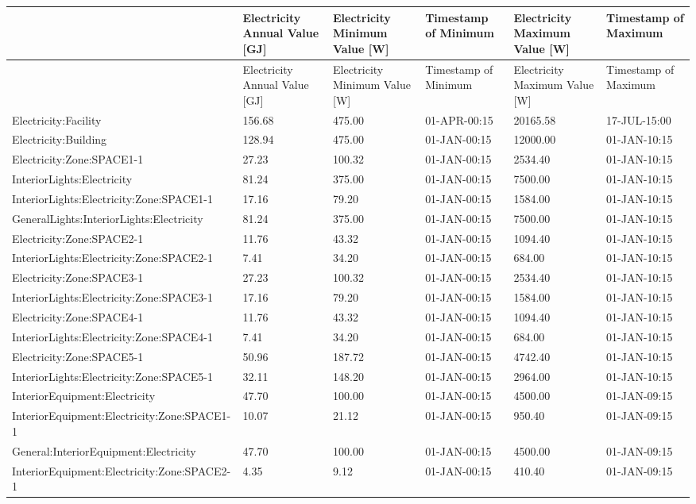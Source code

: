{\scriptsize
\begin{longtable}[c]{>{\raggedright}p{1.5in}>{\raggedright}p{0.9in}>{\raggedright}p{0.9in}>{\raggedright}p{0.9in}>{\raggedright}p{0.9in}>{\raggedright}p{0.9in}}
\toprule 
 & Electricity Annual Value [GJ] & Electricity Minimum Value [W] & Timestamp of Minimum & Electricity Maximum Value [W] & Timestamp of Maximum \tabularnewline
\midrule
\endfirsthead

\toprule 
 & Electricity Annual Value [GJ] & Electricity Minimum Value [W] & Timestamp of Minimum & Electricity Maximum Value [W] & Timestamp of Maximum \tabularnewline
\midrule
\endhead

Electricity\-:Facility & 156.68 & 475.00 & 01-APR-00:15 & 20165.58 & 17-JUL-15:00 \tabularnewline
Electricity\-:Building & 128.94 & 475.00 & 01-JAN-00:15 & 12000.00 & 01-JAN-10:15 \tabularnewline
Electricity\-:Zone:SPACE1-1 & 27.23 & 100.32 & 01-JAN-00:15 & 2534.40 & 01-JAN-10:15 \tabularnewline
InteriorLights\-:Electricity & 81.24 & 375.00 & 01-JAN-00:15 & 7500.00 & 01-JAN-10:15 \tabularnewline
InteriorLights\-:Electricity\-:Zone\-:SPACE1-1 & 17.16 & 79.20 & 01-JAN-00:15 & 1584.00 & 01-JAN-10:15 \tabularnewline
GeneralLights\-:InteriorLights\-:Electricity & 81.24 & 375.00 & 01-JAN-00:15 & 7500.00 & 01-JAN-10:15 \tabularnewline
Electricity\-:Zone\-:SPACE2-1 & 11.76 & 43.32 & 01-JAN-00:15 & 1094.40 & 01-JAN-10:15 \tabularnewline
InteriorLights\-:Electricity\-:Zone\-:SPACE2-1 & 7.41 & 34.20 & 01-JAN-00:15 & 684.00 & 01-JAN-10:15 \tabularnewline
Electricity\-:Zone\-:SPACE3-1 & 27.23 & 100.32 & 01-JAN-00:15 & 2534.40 & 01-JAN-10:15 \tabularnewline
InteriorLights\-:Electricity\-:Zone\-:SPACE3-1 & 17.16 & 79.20 & 01-JAN-00:15 & 1584.00 & 01-JAN-10:15 \tabularnewline
Electricity\-:Zone\-:SPACE4-1 & 11.76 & 43.32 & 01-JAN-00:15 & 1094.40 & 01-JAN-10:15 \tabularnewline
InteriorLights\-:Electricity\-:Zone\-:SPACE4-1 & 7.41 & 34.20 & 01-JAN-00:15 & 684.00 & 01-JAN-10:15 \tabularnewline
Electricity\-:Zone\-:SPACE5-1 & 50.96 & 187.72 & 01-JAN-00:15 & 4742.40 & 01-JAN-10:15 \tabularnewline
InteriorLights\-:Electricity\-:Zone\-:SPACE5-1 & 32.11 & 148.20 & 01-JAN-00:15 & 2964.00 & 01-JAN-10:15 \tabularnewline
InteriorEquipment\-:Electricity & 47.70 & 100.00 & 01-JAN-00:15 & 4500.00 & 01-JAN-09:15 \tabularnewline
InteriorEquipment\-:Electricity\-:Zone\-:SPACE1-1 & 10.07 & 21.12 & 01-JAN-00:15 & 950.40 & 01-JAN-09:15 \tabularnewline
General\-:InteriorEquipment\-:Electricity & 47.70 & 100.00 & 01-JAN-00:15 & 4500.00 & 01-JAN-09:15 \tabularnewline
InteriorEquipment\-:Electricity\-:Zone\-:SPACE2-1 & 4.35 & 9.12 & 01-JAN-00:15 & 410.40 & 01-JAN-09:15 \tabularnewline

\end{longtable}}
